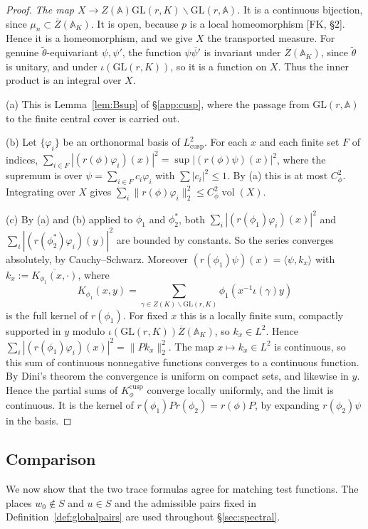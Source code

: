 \documentclass[12pt]{article}
\newcommand{\ov}[1]{\overline{#1}}
\newcommand{\A}{\mathbb{A}}
\newcommand{\vol}{\operatorname{vol}}
\newcommand{\GL}{\mathrm{GL}}
\newcommand{\Zb}{\ov{Z}}
\theoremstyle{plain}
\theoremstyle{definition}
\begin{document}
\begin{proof}
\emph{The map $X\to Z(\A)\GL(r,K)\backslash\GL(r,\A)$.} It is a continuous bijection, since $\mu_n\subset\Zb(\A_K)$. It is open, because $p$ is a local homeomorphism [FK, \S2]. Hence it is a homeomorphism, and we give $X$ the transported measure. For genuine $\tilde\theta$-equivariant $\psi,\psi'$, the function $\psi\ov{\psi'}$ is invariant under $\Zb(\A_K)$, since $\tilde\theta$ is unitary, and under $\iota(\GL(r,K))$, so it is a function on $X$. Thus the inner product is an integral over $X$.

(a) This is Lemma~\ref{lem:Bsup} of \S\ref{app:cusp}, where the passage from $\GL(r,\A)$ to the finite central cover is carried out.

(b) Let $\{\varphi_i\}$ be an orthonormal basis of $L^2_{\mathrm{cusp}}$. For each $x$ and each finite set $F$ of indices, $\sum_{i\in F}|(r(\phi)\varphi_i)(x)|^2=\sup|(r(\phi)\psi)(x)|^2$, where the supremum is over $\psi=\sum_{i\in F}c_i\varphi_i$ with $\sum|c_i|^2\le1$. By (a) this is at most $C_\phi^2$. Integrating over $X$ gives $\sum_i\|r(\phi)\varphi_i\|_2^2\le C_\phi^2\vol(X)$.

(c) By (a) and (b) applied to $\phi_1$ and $\phi_2^*$, both $\sum_i|(r(\phi_1)\varphi_i)(x)|^2$ and $\sum_i|(r(\phi_2^*)\varphi_i)(y)|^2$ are bounded by constants. So the series converges absolutely, by Cauchy--Schwarz. Moreover $(r(\phi_1)\psi)(x)=\langle\psi,k_x\rangle$ with $k_x:=\ov{K_{\phi_1}(x,\cdot)}$, where \[ K_{\phi_1}(x,y)=\sum_{\gamma\in Z(K)\backslash\GL(r,K)}\phi_1(x^{-1}\iota(\gamma)y) \] is the full kernel of $r(\phi_1)$. For fixed $x$ this is a locally finite sum, compactly supported in $y$ modulo $\iota(\GL(r,K))\Zb(\A_K)$, so $k_x\in L^2$. Hence $\sum_i|(r(\phi_1)\varphi_i)(x)|^2=\|Pk_x\|_2^2$. The map $x\mapsto k_x\in L^2$ is continuous, so this sum of continuous nonnegative functions converges to a continuous function. By Dini's theorem the convergence is uniform on compact sets, and likewise in $y$. Hence the partial sums of $K^{\mathrm{cusp}}_\phi$ converge locally uniformly, and the limit is continuous. It is the kernel of $r(\phi_1)Pr(\phi_2)=r(\phi)P$, by expanding $r(\phi_2)\psi$ in the basis.
\end{proof}

\subsection{Comparison}\label{subsec:comparison}
We now show that the two trace formulas agree for matching test functions. The places $w_0\notin S$ and $u\in S$ and the admissible pairs fixed in Definition~\ref{def:globalpairs} are used throughout \S\ref{sec:spectral}.
\end{document}
